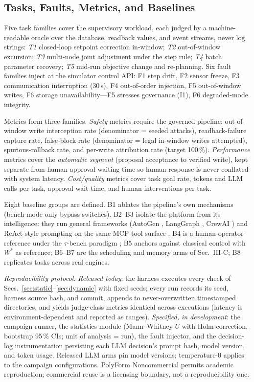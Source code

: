 \subsection{Tasks, Faults, Metrics, and Baselines}
Five task families cover the supervisory workload, each judged by a machine-readable oracle over the database, readback values, and event streams, never log strings: \emph{T1} closed-loop setpoint correction in-window; \emph{T2} out-of-window excursion; \emph{T3} multi-node joint adjustment under the step rule; \emph{T4} batch parameter recovery; \emph{T5} mid-run objective change and re-planning. Six fault families inject at the simulator control API: F1 step drift, F2 sensor freeze, F3 communication interruption (30\,s), F4 out-of-order injection, F5 out-of-window writes, F6 storage unavailability---F5 stresses governance (I1), F6 degraded-mode integrity.

Metrics form three families. \emph{Safety} metrics require the governed pipeline: out-of-window write interception rate (denominator = seeded attacks), readback-failure capture rate, false-block rate (denominator = legal in-window writes attempted), spurious-rollback rate, and per-write attribution rate (target 100\,\%). \emph{Performance} metrics cover the \emph{automatic segment} (proposal acceptance to verified write), kept separate from human-approval waiting time so human response is never conflated with system latency. \emph{Cost/quality} metrics cover task goal rate, tokens and LLM calls per task, approval wait time, and human interventions per task.

Eight baseline groups are defined. B1 ablates the pipeline's own mechanisms (bench-mode-only bypass switches). B2--B3 isolate the platform from its intelligence: they run general frameworks (AutoGen \cite{wu2023autogen}, LangGraph \cite{langgraph2024}, CrewAI \cite{crewai2024}) and ReAct-style prompting \cite{yao2023react} on the same MCP tool surface \cite{mcp2024}. B4 is a human-operator reference under the $\tau$-bench paradigm \cite{yao2024taubench}; B5 anchors against classical control with $W^{*}$ as reference; B6--B7 are the scheduling and memory arms of Sec.~III-C; B8 replicates tasks across real engines.

\emph{Reproducibility protocol.} \emph{Released today}: the harness executes every check of Secs.~\ref{sec:static}--\ref{sec:dynamic} with fixed seeds; every run records its seed, harness source hash, and commit, appends to never-overwritten timestamped directories, and yields judge-class metrics identical across executions (latency is environment-dependent and reported as ranges). \emph{Specified, in development}: the campaign runner, the statistics module (Mann--Whitney $U$ with Holm correction, bootstrap 95\,\% CIs; unit of analysis = run), the fault injector, and the decision-log instrumentation persisting each LLM decision's prompt hash, model version, and token usage. Released LLM arms pin model versions; temperature-0 applies to the campaign configurations. PolyForm Noncommercial permits academic reproduction; commercial reuse is a licensing boundary, not a reproducibility one.
